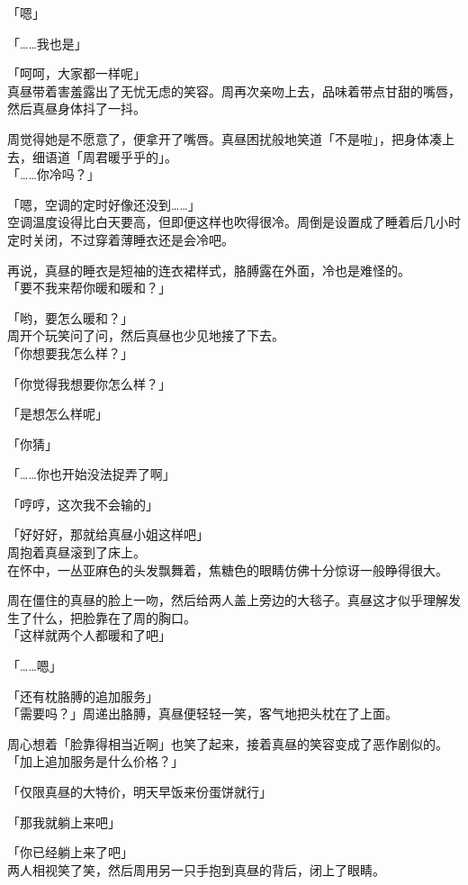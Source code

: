 「嗯」

「……我也是」

「呵呵，大家都一样呢」\\

真昼带着害羞露出了无忧无虑的笑容。周再次亲吻上去，品味着带点甘甜的嘴唇，然后真昼身体抖了一抖。

周觉得她是不愿意了，便拿开了嘴唇。真昼困扰般地笑道「不是啦」，把身体凑上去，细语道「周君暖乎乎的」。\\

「……你冷吗？」

「嗯，空调的定时好像还没到……」\\

空调温度设得比白天要高，但即便这样也吹得很冷。周倒是设置成了睡着后几小时定时关闭，不过穿着薄睡衣还是会冷吧。

再说，真昼的睡衣是短袖的连衣裙样式，胳膊露在外面，冷也是难怪的。\\

「要不我来帮你暖和暖和？」

「哟，要怎么暖和？」\\%

周开个玩笑问了问，然后真昼也少见地接了下去。\\

「你想要我怎么样？」

「你觉得我想要你怎么样？」

「是想怎么样呢」

「你猜」

「……你也开始没法捉弄了啊」

「哼哼，这次我不会输的」

「好好好，那就给真昼小姐这样吧」\\

周抱着真昼滚到了床上。\\

在怀中，一丛亚麻色的头发飘舞着，焦糖色的眼睛仿佛十分惊讶一般睁得很大。

周在僵住的真昼的脸上一吻，然后给两人盖上旁边的大毯子。真昼这才似乎理解发生了什么，把脸靠在了周的胸口。\\

「这样就两个人都暖和了吧」

「……嗯」

「还有枕胳膊的追加服务」\\

「需要吗？」周递出胳膊，真昼便轻轻一笑，客气地把头枕在了上面。

周心想着「脸靠得相当近啊」也笑了起来，接着真昼的笑容变成了恶作剧似的。\\

「加上追加服务是什么价格？」

「仅限真昼的大特价，明天早饭来份蛋饼就行」

「那我就躺上来吧」

「你已经躺上来了吧」\\

两人相视笑了笑，然后周用另一只手抱到真昼的背后，闭上了眼睛。
